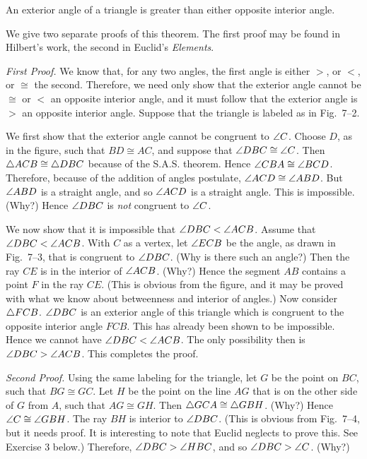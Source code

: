 \documentclass[11pt]{book}
\begin{document}
\begin{theorem}
An exterior angle of a triangle is greater than either opposite interior angle.
\end{theorem}

We give two separate proofs of this theorem. The first proof may be found in
Hilbert's work, the second in Euclid's \emph{Elements}.

\noindent\emph{First Proof.}\quad
We know that, for any two angles, the first angle is either $>$, or $<$, or
$\cong$ the second. Therefore, we need only show that the exterior angle
cannot be $\cong$ or $<$ an opposite interior angle, and it must follow that
the exterior angle is $>$ an opposite interior angle. Suppose that the triangle
is labeled as in Fig.~7--2.

\FIGVIITWOTHREE

We first show that the exterior angle cannot be congruent to $\angle C$. Choose
$D$, as in the figure, such that $BD \cong AC$, and suppose that
$\angle DBC \cong \angle C$. Then $\triangle ACB \cong \triangle DBC$ because of the
S.A.S. theorem. Hence $\angle CBA \cong \angle BCD$. Therefore, because of the
addition of angles postulate, $\angle ACD \cong \angle ABD$. But $\angle ABD$ is
a straight angle, and so $\angle ACD$ is a straight angle. This is impossible.
(Why?) Hence $\angle DBC$ is \emph{not} congruent to $\angle C$.

We now show that it is impossible that $\angle DBC < \angle ACB$. Assume that
$\angle DBC < \angle ACB$. With $C$ as a vertex, let $\angle ECB$ be the angle, as
drawn in Fig.~7--3, that is congruent to $\angle DBC$. (Why is there such an
angle?) Then the ray $CE$ is in the interior of $\angle ACB$. (Why?) Hence the
segment $AB$ contains a point $F$ in the ray $CE$. (This is obvious from the
figure, and it may be proved with what we know about betweenness and interior
of angles.) Now consider $\triangle FCB$. $\angle DBC$ is an exterior angle of this
triangle which is congruent to the opposite interior angle $FCB$. This has
already been shown to be impossible. Hence we cannot have
$\angle DBC < \angle ACB$. The only possibility then is
$\angle DBC > \angle ACB$. This completes the proof.

\noindent\emph{Second Proof.}\quad
Using the same labeling for the triangle, let $G$ be the point on $BC$, such
that $BG \cong GC$. Let $H$ be the point on the line $AG$ that is on the other
side of $G$ from $A$, such that $AG \cong GH$. Then
$\triangle GCA \cong \triangle GBH$. (Why?) Hence $\angle C \cong \angle GBH$. The ray
$BH$ is interior to $\angle DBC$. (This is obvious from Fig.~7--4, but it needs
proof. It is interesting to note that Euclid neglects to prove this. See
Exercise 3 below.) Therefore, $\angle DBC > \angle HBC$, and so
$\angle DBC > \angle C$. (Why?)
\end{document}
